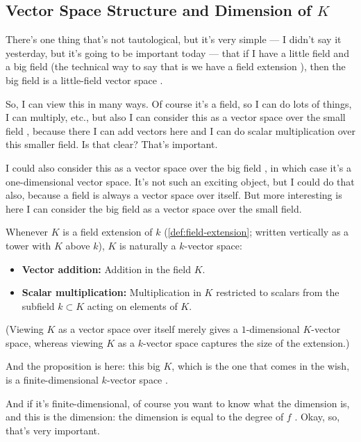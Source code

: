 \subsection{Vector Space Structure and Dimension of \texorpdfstring{$K$}{K}}

\begin{speech}[00:02:23 - 00:03:20]
There's one thing that's not tautological, but it's very simple --- I didn't say it yesterday, but it's going to be important today --- that if I have a little field and a big field (the technical way to say that is we have a field extension ), then the big field is a little-field vector space .

So, I can view this in many ways. Of course it's a field, so I can do lots of things, I can multiply, etc., but also I can consider this  as a vector space over the small field , because there I can add vectors here and I can do scalar multiplication over this smaller field. Is that clear? That's important.

I could also consider this as a vector space over the big field , in which case it's a one-dimensional vector space. It's not such an exciting object, but I could do that also, because a field is always a vector space over itself. But more interesting is here I can consider the big field as a vector space over the small field.
\end{speech}

\begin{content}
Whenever $K$ is a field extension of $k$ (\cref{def:field-extension}; written vertically as a tower with $K$ above $k$), $K$ is naturally a $k$-vector space:
\begin{itemize}
    \item \textbf{Vector addition:} Addition in the field $K$.
    \item \textbf{Scalar multiplication:} Multiplication in $K$ restricted to scalars from the subfield $k \subset K$ acting on elements of $K$.
\end{itemize}
(Viewing $K$ as a vector space over itself merely gives a $1$-dimensional $K$-vector space, whereas viewing $K$ as a $k$-vector space captures the size of the extension.)
\end{content}

\begin{speech}[00:03:20 - 00:04:05]
And the proposition is here: this big $K$, which is the one that comes in the wish, is a finite-dimensional $k$-vector space .

And if it's finite-dimensional, of course you want to know what the dimension is, and this is the dimension: the dimension is equal to the degree of $f$ . Okay, so, that's very important.
\end{speech}

